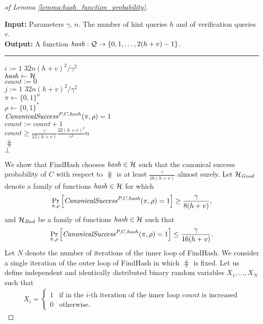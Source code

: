 \begin{proof}[of Lemma \ref{lemma:hash_function_probability}]
\begin{codeblock}
  \textbf{Input:} Parameters $\gamma$, $n$. The number of hint queries $h$ and of verification queries $v$. \\
  \textbf{Output:} A function $\operatorname{\mathit{hash}}:\mathcal{Q} \rightarrow \{0,1, \dots, 2(h+v)-1 \}$.
  \medskip\hrule
  \For $i := 1$ \To $32n(h+v)^2/\gamma^2$ \Do \\
  \IndI $\operatorname{\mathit{hash}} \leftarrow{} \mathcal{H}$ \\
  \IndI $\mathit{count} := 0$ \\
  \IndI \For $j := 1$ \To $32n(h+v)^2/\gamma^2$ \Do \\
  \IndII $\pi \leftarrow \{0,1\}^{n} $\\
  \IndII $\rho \leftarrow \{0,1\}^*$ \\
  \IndII \If $\operatorname{\mathit{CanonicalSuccess}}^{P, C, \operatorname{\mathit{hash}}}(\pi, \rho) = 1$ \Then \\
  \IndIII $\mathit{count} := \mathit{count} + 1$\\
  \IndI \If $\mathit{count} \geq \frac{\gamma}{12(h+v)} \frac{32(h+v)^2}{\gamma^2}n$ \Then \\
  \IndII \Return $\hash$\\
  \Return $\bot$
\end{codeblock}
We show that FindHash chooses $\operatorname{\mathit{hash}} \in \mathcal{H}$ such that the canonical success probability of $C$
with respect to $\hash$ is at least $\frac{\gamma}{16(h+v)}$ almost surely.
Let $\mathcal{H}_{\operatorname{\mathit{Good}}}$ denote a family of functions $\operatorname{\mathit{hash}} \in \mathcal{H}$ for which
\begin{align}
  \label{eq:hash_good}
\underset{\pi, \rho}{\Pr}\left[\operatorname{\mathit{CanonicalSuccess}}^{P, C, \operatorname{\mathit{hash}}}(\pi, \rho) = 1\right] \geq \frac{\gamma}{8(h+v)},
\end{align}
and $\mathcal{H}_{\mathit{Bad}}$ be a family of functions $\operatorname{\mathit{hash}} \in \mathcal{H}$ such that
\begin{align}
  \label{eq:hash_bad}
  \underset{\pi, \rho}{\Pr}\left[\operatorname{\mathit{CanonicalSuccess}}^{P, C, \operatorname{\mathit{hash}}}(\pi, \rho) = 1\right] \leq \frac{\gamma}{16(h+v)}.
\end{align}
Let $N$ denote the number of iterations of the inner loop of FindHash.
We consider a single iteration of the outer loop of FindHash in which $\hash$ is fixed.
Let us define independent and identically distributed binary random variables $X_1, \dots, X_{N}$ such that
\begin{align*}
  X_i =
  \begin{cases}
    1 & \text{if in the $i$-th iteration of the inner loop $\mathit{count}$ is increased}\\
    0 & \text{otherwise.}
  \end{cases}

\end{align*}
\end{proof}
